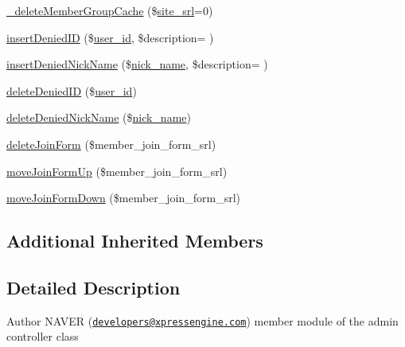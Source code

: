 \begin{DoxyCompactItemize}
\item 
\hyperlink{classmemberAdminController_a7b71ebe2a2dd5fb46d23ac43f15af38e}{\+\_\+delete\+Member\+Group\+Cache} (\$\hyperlink{ko_8install_8php_a8b1406b4ad1048041558dce6bfe89004}{site\+\_\+srl}=0)
\item 
\hyperlink{classmemberAdminController_ac60bb370f5cac395c99b05723ece5ccb}{insert\+Denied\+ID} (\$\hyperlink{ko_8install_8php_a74f1a394389d774e5b4cd5d1d15413f7}{user\+\_\+id}, \$description= \textquotesingle{}\textquotesingle{})
\item 
\hyperlink{classmemberAdminController_af3b39a52edd371b5dd5071987f25ed64}{insert\+Denied\+Nick\+Name} (\$\hyperlink{ko_8install_8php_a151ecae87a1f3d7e257aa089803086bd}{nick\+\_\+name}, \$description= \textquotesingle{}\textquotesingle{})
\item 
\hyperlink{classmemberAdminController_af7f02615adb1cbd7b8b91a330bda1a38}{delete\+Denied\+ID} (\$\hyperlink{ko_8install_8php_a74f1a394389d774e5b4cd5d1d15413f7}{user\+\_\+id})
\item 
\hyperlink{classmemberAdminController_a20792ed4ccef3abf09eb3fbd5dd955fb}{delete\+Denied\+Nick\+Name} (\$\hyperlink{ko_8install_8php_a151ecae87a1f3d7e257aa089803086bd}{nick\+\_\+name})
\item 
\hyperlink{classmemberAdminController_a3fbfbbc1a77c7aaaed901e08fd2ec09c}{delete\+Join\+Form} (\$member\+\_\+join\+\_\+form\+\_\+srl)
\item 
\hyperlink{classmemberAdminController_a6ab62c7dab973a7dc4d12b7739d82660}{move\+Join\+Form\+Up} (\$member\+\_\+join\+\_\+form\+\_\+srl)
\item 
\hyperlink{classmemberAdminController_a07d6306d7ed6eadca11fdc8ca9eb10d4}{move\+Join\+Form\+Down} (\$member\+\_\+join\+\_\+form\+\_\+srl)
\end{DoxyCompactItemize}
\subsection*{Additional Inherited Members}


\subsection{Detailed Description}
\begin{DoxyAuthor}{Author}
N\+A\+V\+ER (\href{mailto:developers@xpressengine.com}{\tt developers@xpressengine.\+com}) member module of the admin controller class 
\end{DoxyAuthor}


